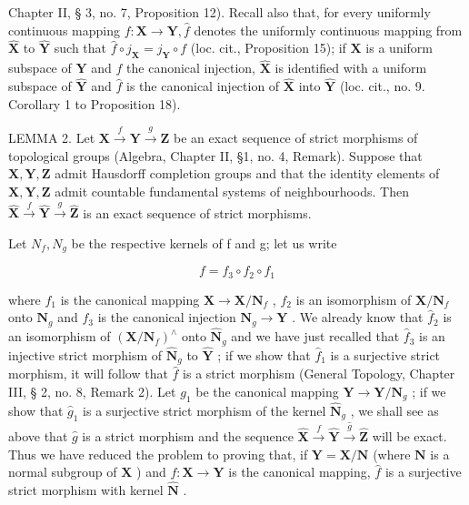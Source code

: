 Chapter II, § 3, no. 7, Proposition 12). Recall also that, for every uniformly continuous mapping \(f\colon\mathbf{X}\to\mathbf{Y},\hat{f}\) denotes the uniformly continuous mapping from \(\hat{\mathbf{X}}\) to \(\hat{\mathbf{Y}}\) such that \(\hat{f}\circ j_{\mathbf{X}}=j_{\mathbf{Y}}\circ f\) (loc. cit., Proposition 15); if \(\mathbf{X}\) is a uniform subspace of \(\mathbf{Y}\) and \(f\) the canonical injection, \(\hat{\mathbf{X}}\) is identified with a uniform subspace of \(\hat{\mathbf{Y}}\) and \(\hat{f}\) is the canonical injection of \(\hat{\mathbf{X}}\) into \(\hat{\mathbf{Y}}\) (loc. cit., no. 9. Corollary 1 to Proposition 18).

LEMMA 2. Let \(\mathbf{X} \xrightarrow{f} \mathbf{Y} \xrightarrow{g} \mathbf{Z}\) be an exact sequence of strict morphisms of topological groups (Algebra, Chapter II, §1, no. 4, Remark). Suppose that \(\mathbf{X}, \mathbf{Y}, \mathbf{Z}\) admit Hausdorff completion groups and that the identity elements of \(\mathbf{X}, \mathbf{Y}, \mathbf{Z}\) admit countable fundamental systems of neighbourhoods. Then \(\hat{\mathbf{X}} \xrightarrow{f} \hat{\mathbf{Y}} \xrightarrow{g} \hat{\mathbf{Z}}\) is an exact sequence of strict morphisms.

Let \(N_{f}, N_{g}\) be the respective kernels of f and g; let us write

\[
f = f _ {3} \circ f _ {2} \circ f _ {1}
\]

where \(f_1\) is the canonical mapping \(\mathbf{X} \to \mathbf{X} / \mathbf{N}_f\) , \(f_2\) is an isomorphism of \(\mathbf{X} / \mathbf{N}_f\) onto \(\mathbf{N}_g\) and \(f_3\) is the canonical injection \(\mathbf{N}_g \to \mathbf{Y}\) . We already know that \(\hat{f}_2\) is an isomorphism of \((\mathbf{X} / \mathbf{N}_f)^{\wedge}\) onto \(\hat{\mathbf{N}}_g\) and we have just recalled that \(\hat{f}_3\) is an injective strict morphism of \(\hat{\mathbf{N}}_g\) to \(\hat{\mathbf{Y}}\) ; if we show that \(\hat{f}_1\) is a surjective strict morphism, it will follow that \(\hat{f}\) is a strict morphism (General Topology, Chapter III, § 2, no. 8, Remark 2). Let \(g_1\) be the canonical mapping \(\mathbf{Y} \to \mathbf{Y} / \mathbf{N}_g\) ; if we show that \(\hat{g}_1\) is a surjective strict morphism of the kernel \(\hat{\mathbf{N}}_g\) , we shall see as above that \(\hat{g}\) is a strict morphism and the sequence \(\hat{\mathbf{X}}\xrightarrow{f}\hat{\mathbf{Y}}\xrightarrow{\hat{g}}\hat{\mathbf{Z}}\) will be exact. Thus we have reduced the problem to proving that, if \(\mathbf{Y}=\mathbf{X}/\mathbf{N}\) (where \(\mathbf{N}\) is a normal subgroup of \(\mathbf{X}\) ) and \(f\colon\mathbf{X}\to\mathbf{Y}\) is the canonical mapping, \(\hat{f}\) is a surjective strict morphism with kernel \(\hat{\mathbf{N}}\) .

